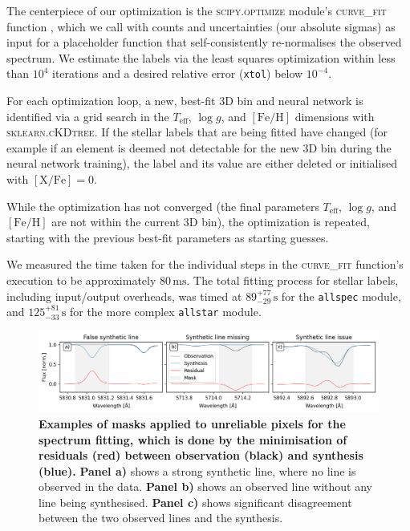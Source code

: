 \documentclass[
  journal=pasa,
  manuscript=research-paper, %
  year=2024,
  volume=37
]{cup-journal}
\newcommand{\Teff}{$T_\mathrm{eff}$\xspace}
\newcommand{\logg}{$\log g$\xspace}
\newcommand{\feh}{$\mathrm{[Fe/H]}$\xspace}
\newcommand{\TLF}{\Teff, \logg, and \feh}
\begin{document}
The centerpiece of our optimization is the \textsc{scipy.optimize} module's \textsc{curve\_fit} function \citep{scipy}, which we call with counts and uncertainties (our absolute sigmas) as input for a placeholder function that self-consistently re-normalises the observed spectrum. We estimate the labels via the least squares optimization within less than $10^4$ iterations and a desired relative error (\texttt{xtol}) below $10^{-4}$.

For each optimization loop, a new, best-fit 3D bin and neural network is identified via a grid search in the \TLF dimensions with \textsc{sklearn.cKDtree}. If the stellar labels that are being fitted have changed (for example if an element is deemed not detectable for the new 3D bin during the neural network training), the label and its value are either deleted or initialised with $\mathrm{[X/Fe]} = 0$.

While the optimization has not converged (the final parameters \TLF are not within the current 3D bin), the optimization is repeated, starting with the previous best-fit parameters as starting guesses.

We measured the time taken for the individual steps in the \textsc{curve\_fit} function's execution to be approximately $80\,\mathrm{ms}$. The total fitting process for stellar labels, including input/output overheads, was timed at $89_{-29}^{+77}\,\mathrm{s}$ for the \texttt{allspec} module, and $125_{-33}^{+81}\,\mathrm{s}$ for the more complex \texttt{allstar} module.

\begin{figure}[ht]
\centering  
\includegraphics[width=\textwidth]{figures/example_masking_sun.png}
\caption{\textbf{Examples of masks applied to unreliable pixels for the spectrum fitting, which is done by the minimisation of residuals (red) between observation (black) and synthesis (blue).} \textbf{Panel a)} shows a strong synthetic line, where no line is observed in the data. \textbf{Panel b)} shows an observed line without any line being synthesised. \textbf{Panel c)} shows significant disagreement between the two observed lines and the synthesis.} \label{fig:example_masking_sun}
\end{figure}
\end{document}
